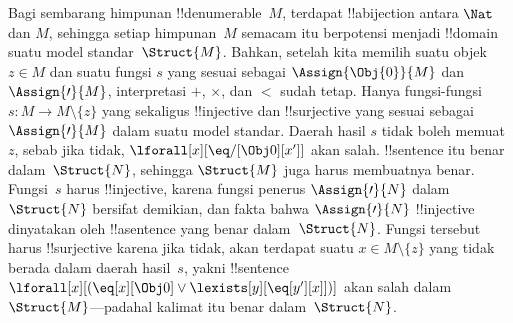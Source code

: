 \documentclass[../../../include/open-logic-section]{subfiles}
\begin{document}
\begin{explain}
Bagi sembarang himpunan !!{denumerable}~$M$, terdapat !!a{bijection} antara
$\Nat$ dan $M$, sehingga setiap himpunan~$M$ semacam itu berpotensi menjadi
!!{domain} suatu model standar~$\Struct{M}$. Bahkan, setelah kita memilih
suatu objek $z \in M$ dan suatu fungsi $s$ yang sesuai sebagai
$\Assign{\Obj{0}}{M}$ dan $\Assign{\prime}{M}$, interpretasi $+$, $\times$,
dan $<$ sudah tetap. Hanya fungsi-fungsi $s\colon M \to M \setminus \{z\}$
yang sekaligus !!{injective} dan !!{surjective} yang sesuai sebagai
$\Assign{\prime}{M}$ dalam suatu model standar. Daerah hasil $s$ tidak boleh
memuat~$z$, sebab jika tidak, $\lforall[x][\eq/[\Obj 0][x']]$ akan salah.
!!{sentence} itu benar dalam~$\Struct{N}$, sehingga $\Struct{M}$ juga harus
membuatnya benar. Fungsi~$s$ harus !!{injective}, karena fungsi penerus
$\Assign{\prime}{N}$ dalam~$\Struct{N}$ bersifat demikian, dan fakta bahwa
$\Assign{\prime}{N}$ !!{injective} dinyatakan oleh !!a{sentence} yang benar
dalam~$\Struct{N}$. Fungsi tersebut harus !!{surjective} karena jika tidak,
akan terdapat suatu $x \in M \setminus \{z\}$ yang tidak berada dalam daerah
hasil~$s$, yakni !!{sentence}
$\lforall[x][(\eq[x][\Obj 0] \lor \lexists[y][\eq[y'][x]])]$ akan salah
dalam~$\Struct{M}$---padahal kalimat itu benar dalam~$\Struct{N}$.
\end{explain}
\end{document}
